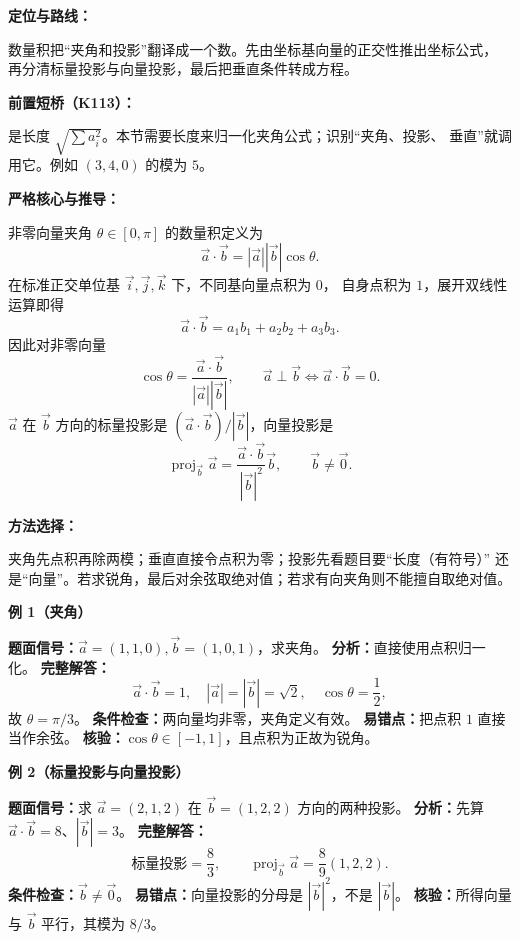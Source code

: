 \par

\begin{knowledgeBox}
\textbf{定位与路线：}

数量积把“夹角和投影”翻译成一个数。先由坐标基向量的正交性推出坐标公式，
再分清标量投影与向量投影，最后把垂直条件转成方程。

\textbf{前置短桥（K113）：}

是长度
\(\sqrt{\sum a_i^2}\)。本节需要长度来归一化夹角公式；识别“夹角、投影、
垂直”就调用它。例如 \((3,4,0)\) 的模为 \(5\)。

\textbf{严格核心与推导：}

非零向量夹角 \(\theta\in[0,\pi]\) 的数量积定义为
\[
\vec a\cdot\vec b=|\vec a||\vec b|\cos\theta.
\]
在标准正交单位基 \(\vec i,\vec j,\vec k\) 下，不同基向量点积为 \(0\)，
自身点积为 \(1\)，展开双线性运算即得
\[
\vec a\cdot\vec b=a_1b_1+a_2b_2+a_3b_3.
\]
因此对非零向量
\[
\cos\theta=\frac{\vec a\cdot\vec b}{|\vec a||\vec b|},\qquad
\vec a\perp\vec b\Longleftrightarrow\vec a\cdot\vec b=0.
\]
\(\vec a\) 在 \(\vec b\) 方向的标量投影是
\((\vec a\cdot\vec b)/|\vec b|\)，向量投影是
\[
\operatorname{proj}_{\vec b}\vec a
=\frac{\vec a\cdot\vec b}{|\vec b|^2}\vec b,\qquad \vec b\ne\vec0.
\]

\textbf{方法选择：}

夹角先点积再除两模；垂直直接令点积为零；投影先看题目要“长度（有符号）”
还是“向量”。若求锐角，最后对余弦取绝对值；若求有向夹角则不能擅自取绝对值。

\textbf{例 1（夹角）}

\textbf{题面信号：}\(\vec a=(1,1,0),\vec b=(1,0,1)\)，求夹角。
\textbf{分析：}直接使用点积归一化。
\textbf{完整解答：}
\[
\vec a\cdot\vec b=1,\quad |\vec a|=|\vec b|=\sqrt2,
\quad \cos\theta=\frac12,
\]
故 \(\theta=\pi/3\)。
\textbf{条件检查：}两向量均非零，夹角定义有效。
\textbf{易错点：}把点积 \(1\) 直接当作余弦。
\textbf{核验：}\(\cos\theta\in[-1,1]\)，且点积为正故为锐角。

\textbf{例 2（标量投影与向量投影）}

\textbf{题面信号：}求 \(\vec a=(2,1,2)\) 在
\(\vec b=(1,2,2)\) 方向的两种投影。
\textbf{分析：}先算 \(\vec a\cdot\vec b=8\)、\(|\vec b|=3\)。
\textbf{完整解答：}
\[
\text{标量投影}=\frac83,\qquad
\operatorname{proj}_{\vec b}\vec a
=\frac89(1,2,2).
\]
\textbf{条件检查：}\(\vec b\ne\vec0\)。
\textbf{易错点：}向量投影的分母是 \(|\vec b|^2\)，不是 \(|\vec b|\)。
\textbf{核验：}所得向量与 \(\vec b\) 平行，其模为 \(8/3\)。


\end{knowledgeBox}
